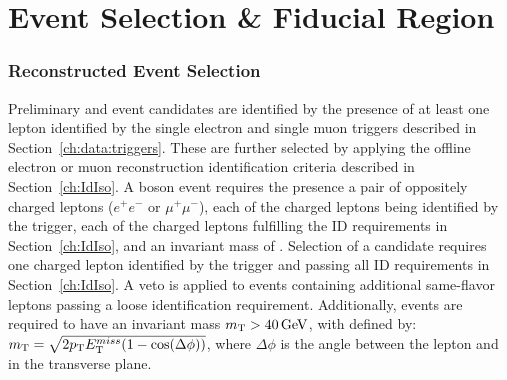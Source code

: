 




\section{Event Selection \& Fiducial Region}
 \subsubsection{Reconstructed Event Selection}
Preliminary \Wpm and \Z event candidates are identified by the presence of at least one lepton identified by the single electron and single muon triggers described in Section~\ref{ch:data:triggers}. These are further selected by applying the offline electron or muon reconstruction identification criteria described in Section~\ref{ch:IdIso}. 
A \Z boson event requires the presence a pair of oppositely charged leptons ($e^{+}e^{-}$ or $\mu^{+}\mu^{-}$), each of the charged leptons being identified by the trigger, each of the charged leptons fulfilling the ID requirements in Section~\ref{ch:IdIso}, and an invariant mass of \masswindow. 
Selection of a \Wpm candidate requires one charged lepton identified by the trigger and passing all ID requirements in Section~\ref{ch:IdIso}. A veto is applied to events containing additional same-flavor leptons passing a loose identification requirement. Additionally, \Wpm events are required to have an invariant mass $m_{\mathrm{T}} > 40\,\text{Ge\hspace{-.08em}V}$, with \mt defined by: 
$m_{\mathrm{T}} = \sqrt{ 2 p_{\mathrm{T}} E_{\mathrm{T}}^{miss} ( 1 - \cos(\Delta\phi) ) }$, where $\Delta\phi$ is the angle between the lepton and \vmet in the transverse plane.

